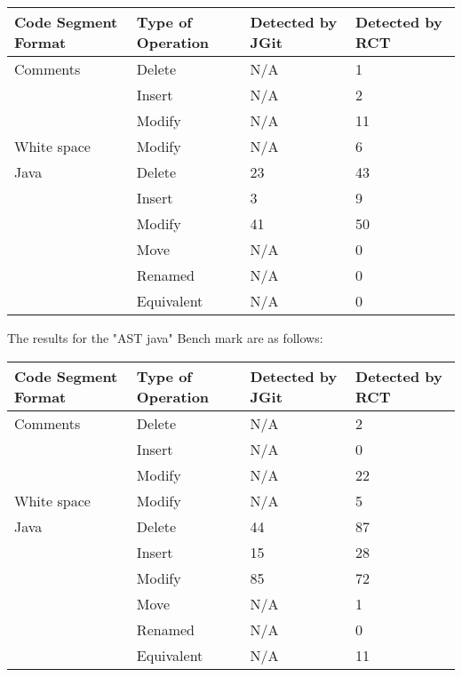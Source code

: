 \begin{table}[H]
    \begin{tabular}{llll}
    Code Segment Format & Type of Operation & Detected by JGit & Detected by RCT \\ \hline
    Comments            & Delete            & N/A              & 1               \\
    ~                   & Insert            & N/A              & 2               \\
    ~                   & Modify            & N/A              & 11              \\
    White space         & Modify            & N/A              & 6               \\
    Java                & Delete            & 23               & 43              \\
    ~                   & Insert            & 3                & 9               \\
    ~                   & Modify            & 41               & 50              \\
    ~                   & Move              & N/A              & 0               \\
    ~                   & Renamed           & N/A              & 0               \\
    ~                   & Equivalent        & N/A              & 0               \\
    \end{tabular}
\end{table}

The results for the "AST java" Bench mark are as follows:

\begin{table}[H]
    \begin{tabular}{llll}
    Code Segment Format & Type of Operation & Detected by JGit & Detected by RCT \\ \hline
    Comments            & Delete            & N/A              & 2               \\
    ~                   & Insert            & N/A              & 0               \\
    ~                   & Modify            & N/A              & 22              \\
    White space         & Modify            & N/A              & 5               \\
    Java                & Delete            & 44               & 87              \\
    ~                   & Insert            & 15               & 28              \\
    ~                   & Modify            & 85               & 72              \\ 
    ~                   & Move              & N/A              & 1               \\
    ~                   & Renamed           & N/A              & 0               \\
    ~                   & Equivalent        & N/A              & 11              \\
    \end{tabular}
\end{table}

